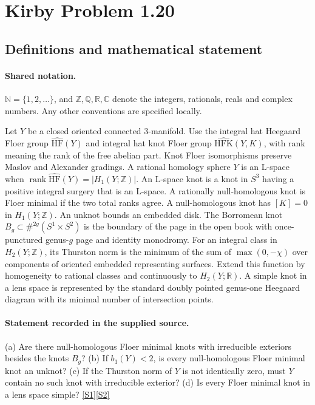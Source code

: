 \documentclass[11pt]{article}
\newcommand{\sref}[2]{\hyperlink{source:#1:#2}{[S#2]}}
\begin{document}
\section{Kirby Problem 1.20}\label{statement}

\subsection{Definitions and mathematical statement}

\paragraph{Shared notation.}$\mathbb N=\{1,2,\ldots\}$, and $\mathbb Z,\mathbb Q,\mathbb R,\mathbb C$ denote the integers, rationals, reals and complex numbers. Any other conventions are specified locally.


Let $Y$ be a closed oriented connected $3$-manifold. Use the integral hat Heegaard Floer group $\widehat{\mathrm{HF}}(Y)$ and integral hat knot Floer group $\widehat{\mathrm{HFK}}(Y,K)$, with rank meaning the rank of the free abelian part. Knot Floer isomorphisms preserve Maslov and Alexander gradings. A rational homology sphere $Y$ is an L-space when $\operatorname{rank}\widehat{\mathrm{HF}}(Y)=|H_1(Y;\mathbb Z)|$. An L-space knot is a knot in $S^3$ having a positive integral surgery that is an L-space. A rationally null-homologous knot is Floer minimal if the two total ranks agree. A null-homologous knot has $[K]=0$ in $H_1(Y;\mathbb Z)$. An unknot bounds an embedded disk. The Borromean knot $B_g\subset\#^{2g}(S^1\times S^2)$ is the boundary of the page in the open book with once-punctured genus-$g$ page and identity monodromy. For an integral class in $H_2(Y;\mathbb Z)$, its Thurston norm is the minimum of the sum of $\max(0,-\chi)$ over components of oriented embedded representing surfaces. Extend this function by homogeneity to rational classes and continuously to $H_2(Y;\mathbb R)$. A simple knot in a lens space is represented by the standard doubly pointed genus-one Heegaard diagram with its minimal number of intersection points.
\paragraph{Statement recorded in the supplied source.}
(a) Are there null-homologous Floer minimal knots with irreducible exteriors besides the knots $B_g$? (b) If $b_1(Y)<2$, is every null-homologous Floer minimal knot an unknot? (c) If the Thurston norm of $Y$ is not identically zero, must $Y$ contain no such knot with irreducible exterior? (d) Is every Floer minimal knot in a lens space simple? \sref{statement}{1}\sref{statement}{2}
\end{document}
